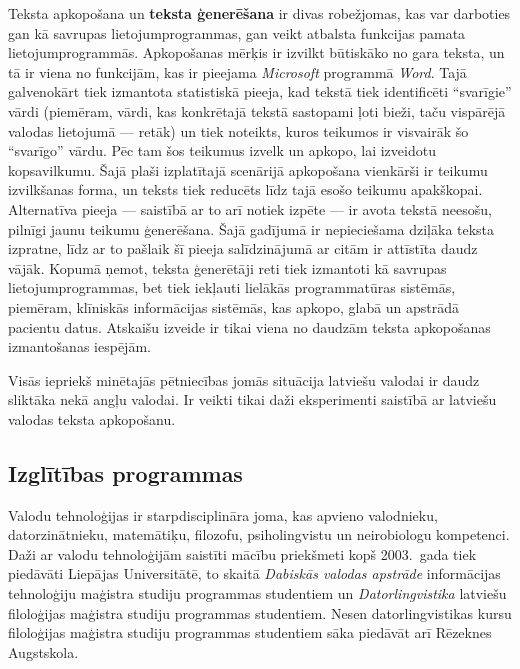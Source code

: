 \begin{multicols}{2}

Teksta apkopošana un \textbf{teksta ģenerēšana} ir divas robežjomas, kas var darboties gan kā savrupas lietojumprogrammas, gan veikt atbalsta funkcijas pamata lietojumprogrammās. 
Apkopošanas mērķis ir izvilkt būtiskāko no gara teksta, un tā ir viena no funk\-cijām, kas ir pieejama \textit{Microsoft} programmā \textit{Word}. 
Tajā galvenokārt tiek izmantota statistiskā pieeja, kad tekstā tiek identificēti “svarīgie” vārdi (piemēram, vārdi, kas konkrētajā tekstā sastopami ļoti bieži, taču vispārējā valodas lietojumā — retāk) un tiek noteikts, kuros teikumos ir visvairāk šo “svarīgo” vārdu. 
Pēc tam šos teikumus izvelk un apkopo, lai izveidotu kopsavilkumu. 
Šajā plaši izplatītajā scenārijā apkopošana vienkārši ir teikumu izvilkšanas forma, un teksts tiek reducēts līdz tajā esošo teikumu apakškopai. 
Alternatīva pieeja — saistībā ar to arī notiek izpēte — ir avota tekstā neesošu, pilnīgi jaunu teikumu ģenerēšana. 
Šajā gadījumā ir nepieciešama dziļāka teksta izpratne, līdz ar to pašlaik šī pieeja salīdzinājumā ar citām ir attīstīta daudz vājāk. 
Kopumā ņemot, teksta ģenerētāji reti tiek izmantoti kā savrupas lietojumprogrammas, bet tiek iekļauti lielākās programmatūras sistēmās, piemēram, klīniskās informācijas sistēmās, kas apkopo, glabā un apstrādā pacientu datus. 
Atskaišu izveide ir tikai viena no daudzām teksta apkopošanas izmantošanas iespējām. 

Visās iepriekš minētajās pētniecības jomās situācija latviešu valodai ir daudz sliktāka nekā angļu valodai. 
Ir veikti tikai daži eksperimenti saistībā ar latviešu valodas teksta apkopošanu.

\subsection{Izglītības programmas}

Valodu tehnoloģijas ir starpdisciplināra joma, kas apvieno valodnieku, datorzinātnieku, matemātiķu, filozofu, psiholingvistu un neirobiologu kompetenci. 
Daži ar valodu tehnoloģijām saistīti mācību priekšmeti kopš 2003.~gada tiek piedāvāti Liepājas Universitātē, to skaitā \textit{Dabiskās valodas apstrāde} informācijas tehnoloģiju maģistra studiju programmas studentiem un \textit{Datorlingvistika} latviešu filoloģijas maģistra studiju programmas studentiem.
Nesen datorlingvistikas kursu filoloģijas maģistra studiju programmas studentiem sāka piedāvāt arī Rēzeknes Augstskola. 


\end{multicols}
